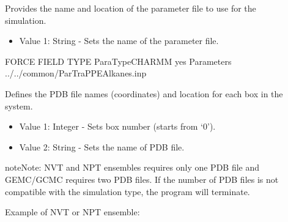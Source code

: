 \documentclass[letterpaper,10pt,english]{sphinxmanual}
\begin{document}
\begin{description}
\item[{}] \leavevmode
Provides the name and location of the parameter file to use for the simulation.
\begin{itemize}
\item {} 
Value 1: String - Sets the name of the parameter file.

\end{itemize}

%
\begin{sphinxVerbatim}[commandchars=\\\{\}]
\PYGZsh{}\PYGZsh{}\PYGZsh{}\PYGZsh{}\PYGZsh{}\PYGZsh{}\PYGZsh{}\PYGZsh{}\PYGZsh{}\PYGZsh{}\PYGZsh{}\PYGZsh{}\PYGZsh{}\PYGZsh{}\PYGZsh{}\PYGZsh{}\PYGZsh{}\PYGZsh{}\PYGZsh{}\PYGZsh{}\PYGZsh{}\PYGZsh{}\PYGZsh{}\PYGZsh{}\PYGZsh{}\PYGZsh{}\PYGZsh{}\PYGZsh{}\PYGZsh{}\PYGZsh{}\PYGZsh{}\PYGZsh{}\PYGZsh{}
\PYGZsh{} FORCE FIELD TYPE
\PYGZsh{}\PYGZsh{}\PYGZsh{}\PYGZsh{}\PYGZsh{}\PYGZsh{}\PYGZsh{}\PYGZsh{}\PYGZsh{}\PYGZsh{}\PYGZsh{}\PYGZsh{}\PYGZsh{}\PYGZsh{}\PYGZsh{}\PYGZsh{}\PYGZsh{}\PYGZsh{}\PYGZsh{}\PYGZsh{}\PYGZsh{}\PYGZsh{}\PYGZsh{}\PYGZsh{}\PYGZsh{}\PYGZsh{}\PYGZsh{}\PYGZsh{}\PYGZsh{}\PYGZsh{}\PYGZsh{}\PYGZsh{}\PYGZsh{}
ParaTypeCHARMM yes
Parameters ../../common/Par\PYGZus{}TraPPE\PYGZus{}Alkanes.inp
\end{sphinxVerbatim}

\item[{}] \leavevmode
Defines the PDB file names (coordinates) and location for each box in the system.
\begin{itemize}
\item {} 
Value 1: Integer - Sets box number (starts from ‘0’).

\item {} 
Value 2: String - Sets the name of PDB file.

\end{itemize}

\begin{sphinxadmonition}{note}{Note:}
NVT and NPT ensembles requires only one PDB file and GEMC/GCMC requires two PDB files. If the number of PDB files is not compatible with the simulation type, the program will terminate.
\end{sphinxadmonition}

Example of NVT or NPT ensemble:


\end{description}
\end{document}
